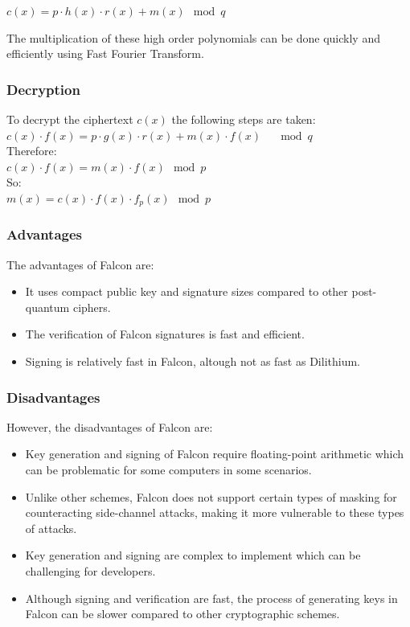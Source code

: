 \documentclass{article}
\begin{document}
$c(x) = p \cdot h(x) \cdot r(x)+m(x) \mod{q}$

The multiplication of these high order polynomials can be done quickly and efficiently using Fast Fourier Transform.

\subsubsection{Decryption}
To decrypt the ciphertext $c(x)$ the following steps are taken:\\
$c(x)\cdot f(x) = p\cdot g(x)\cdot r(x) + m(x)\cdot f(x)\quad \mod{q}$ \\
Therefore:\\
$c(x)\cdot f(x) = m(x)\cdot f(x) \mod{p}$ \\
So:\\
$m(x) = c(x)\cdot f(x)\cdot f_p(x) \mod{p}$

\subsubsection{Advantages}
The advantages of Falcon are:\\
\begin{itemize}
    \item It uses compact public key and signature sizes compared to other post-quantum ciphers.
    \item The verification of Falcon signatures is fast and efficient.
    \item Signing is relatively fast in Falcon, altough not as fast as Dilithium.
\end{itemize}

 \subsubsection{Disadvantages}
However, the disadvantages of Falcon are:
\begin{itemize}
    \item Key generation and signing of Falcon require floating-point arithmetic which can be problematic for some computers in some scenarios.
    \item Unlike other schemes, Falcon does not support certain types of masking for counteracting side-channel attacks, making it more vulnerable to these types of attacks.
    \item Key generation and signing are complex to implement which can be challenging for developers.
    \item Although signing and verification are fast, the process of generating keys in Falcon can be slower compared to other cryptographic schemes.
\end{itemize}
\end{document}
